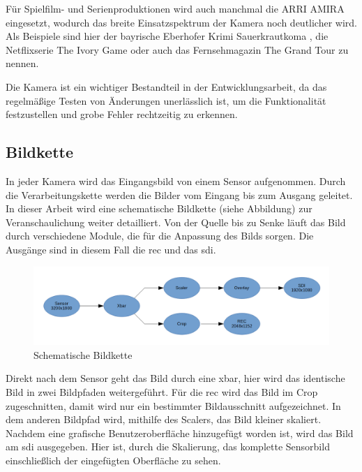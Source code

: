Für Spielfilm- und Serienproduktionen wird auch manchmal die \ac{ARRI} AMIRA eingesetzt, wodurch das breite Einsatzspektrum der Kamera noch deutlicher wird.
Als Beispiele sind hier der bayrische Eberhofer Krimi \glqq Sauerkrautkoma\grqq{} \cite{arrikrimi}, die Netflixserie \glqq The Ivory Game\grqq{} \cite{imdbivory} oder auch das Fernsehmagazin \glqq The Grand Tour\grqq{} \cite{imdbtour} zu nennen.
 
Die Kamera ist ein wichtiger Bestandteil in der Entwicklungsarbeit, da das regelmäßige Testen von Änderungen unerlässlich ist, um die Funktionalität festzustellen und grobe Fehler rechtzeitig zu erkennen.

\subsection{Bildkette}
In jeder Kamera wird das Eingangsbild von einem Sensor aufgenommen. Durch die Verarbeitungskette werden die Bilder vom Eingang bis zum Ausgang geleitet. In dieser Arbeit wird eine schematische Bildkette (siehe Abbildung) zur Veranschaulichung weiter detailliert. Von der Quelle bis zu Senke läuft das Bild durch verschiedene Module, die für die Anpassung des Bilds sorgen. Die Ausgänge sind in diesem Fall die \ac{rec} und das \ac{sdi}.

\begin{figure}[!hbtp]
	\centering
	\includegraphics[width = \linewidth]{pictures/2019-11-17_Bildkette.png}
	\smallskip
	\caption{Schematische Bildkette}
	\label{fig:bild}
\end{figure} 

Direkt nach dem Sensor geht das Bild durch eine \ac{xbar}, hier wird das identische Bild in zwei Bildpfaden weitergeführt. Für die \acl{rec} wird das Bild im Crop zugeschnitten, damit wird nur ein bestimmter Bildausschnitt aufgezeichnet. In dem anderen Bildpfad wird, mithilfe des Scalers, das Bild kleiner skaliert. Nachdem eine grafische Benutzeroberfläche hinzugefügt worden ist, wird das Bild am \ac{sdi} ausgegeben. Hier ist, durch die Skalierung, das komplette Sensorbild einschließlich der eingefügten Oberfläche zu sehen.

